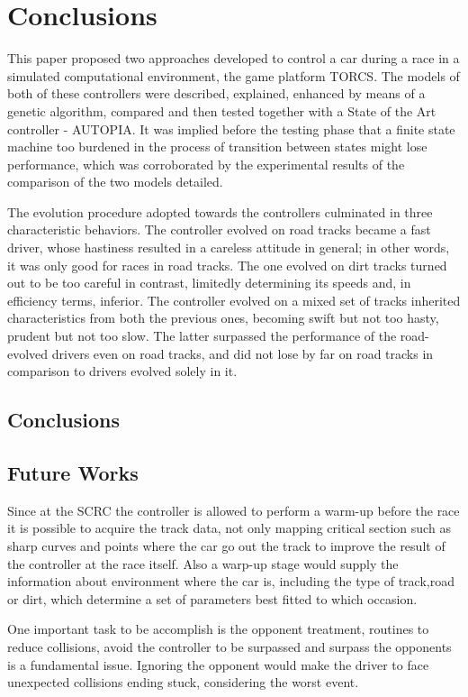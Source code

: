 \section{Conclusions} \label{sec:Conclusions}

	This paper proposed two approaches developed to control a car during a race in a simulated computational environment, the game platform TORCS. The models of both of these controllers were described, explained, enhanced by means of a genetic algorithm, compared and then tested together with a State of the Art controller - AUTOPIA. It was implied before the testing phase that a finite state machine too burdened in the process of transition between states might lose performance, which was corroborated by the experimental results of the comparison of the two models detailed. 
	
	The evolution procedure adopted towards the controllers culminated in three characteristic behaviors. The controller evolved on road tracks became a fast driver, whose hastiness resulted in a careless attitude in general; in other words, it was only good for races in road tracks. The one evolved on dirt tracks turned out to be too careful in contrast, limitedly determining its speeds and, in efficiency terms, inferior. The controller evolved on a mixed set of tracks inherited characteristics from both the previous ones, becoming swift but not too hasty, prudent but not too slow. The latter surpassed the performance of the road-evolved drivers even on road tracks, and did not lose by far on road tracks in comparison to drivers evolved solely in it.
		
\subsection{Conclusions} \label{subsec:Conclusions}


\subsection{Future Works} \label{subsec:Future}
	
	Since at the SCRC the controller is allowed to perform a warm-up before the race it is possible to acquire the track data, not only mapping critical section such as sharp curves and points where the car go out the track to improve the result of the controller at the race itself. Also a warp-up stage would supply the information about environment where the car is, including the type of track,road or dirt, which determine a set of parameters best fitted to which occasion. 
		
	One important task to be accomplish is the opponent treatment, routines to reduce collisions, avoid the controller to be surpassed and surpass the opponents is a fundamental issue. Ignoring the opponent would make the driver to face unexpected collisions ending stuck, considering the worst event.
	
	
	
	
